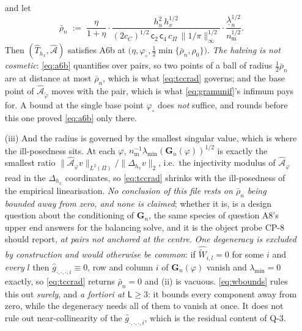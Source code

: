 \begin{proposition}
\begin{enumerate}
\begin{equation}
\end{equation}
and let
\begin{equation}\label{eq:tccrad}
\bar\rho_n\;:=\;\frac{\eta}{1+\eta}\cdot
\frac{h_u^{2}\,h_x^{1/2}}{(2c_C)^{1/2}\,\mathsf c_2\,\mathsf c_4\,c_\Pi\,\|1/\pi\|_\infty^{1/2}}
\cdot\frac{\underline\lambda_n^{1/2}}{n_{\mathrm m}^{1/2}} .
\end{equation}
Then $(\hat T_{h_x},\hat{\mathcal A})$ satisfies A6b at
$\big(\eta,\varphi_\circ,\tfrac12\min\{\bar\rho_n,\rho_0\}\big)$.
\emph{The halving is not cosmetic}: \eqref{eq:a6b} quantifies over pairs, so two points of a ball of
radius $\tfrac12\bar\rho_n$ are at distance at most $\bar\rho_n$, which is what \eqref{eq:tccrad}
governs; and the base point of $\hat{\mathcal A}_{\tilde\varphi}$ moves with the pair, which is what
\eqref{eq:gramunif}'s infimum pays for. A bound at the single base point $\varphi_\circ$ does
\emph{not} suffice, and rounds before this one proved \eqref{eq:a6b} only there.
\item[(iii)] And the radius is governed by the smallest singular value, which is where the
ill-posedness sits. At each $\varphi$, $n_{\mathrm m}^{-1}\lambda_{\min}(\mathbf G_n(\varphi))^{1/2}$
is exactly the smallest ratio
$\|\hat{\mathcal A}_{\varphi}v\|_{L^{2}(\Pi)}\big/\|\Delta_{h_x}v\|_{2}$, i.e.\ the injectivity
modulus of $\hat{\mathcal A}_{\varphi}$ read in the $\Delta_{h_x}$ coordinates, so
\eqref{eq:tccrad} shrinks with the ill-posedness of the empirical linearisation. \emph{No conclusion of
this file rests on $\bar\rho_n$ being bounded away from zero, and none is claimed}; whether it is, is a
design question about the conditioning of $\mathbf G_n$, the same species of question A8's upper end
answers for the balancing solve, and it is the object probe CP-8 should report, \emph{at pairs not
anchored at the centre}. \emph{One degeneracy is excluded by construction and would otherwise be
common}: if $\widehat{\widetilde W}_{i,l}=0$ for some $i$ and \emph{every} $l$ then
$\hat g_{\cdot,\cdot,\cdot,i}\equiv0$, row and
column $i$ of $\mathbf G_n(\varphi)$ vanish and $\lambda_{\min}=0$ exactly, so \eqref{eq:tccrad} returns
$\bar\rho_n=0$ and (ii) is vacuous. \eqref{eq:wbounds} rules this out \emph{surely}, and \emph{a fortiori
at $\mathsf L\ge3$}: it bounds every component away from zero, while the degeneracy needs all of them to
vanish at once. It does not rule
out near-collinearity of the $\hat g_{\cdot,\cdot,\cdot,i}$, which is the residual content of Q-3.
\end{enumerate}
\end{proposition}

